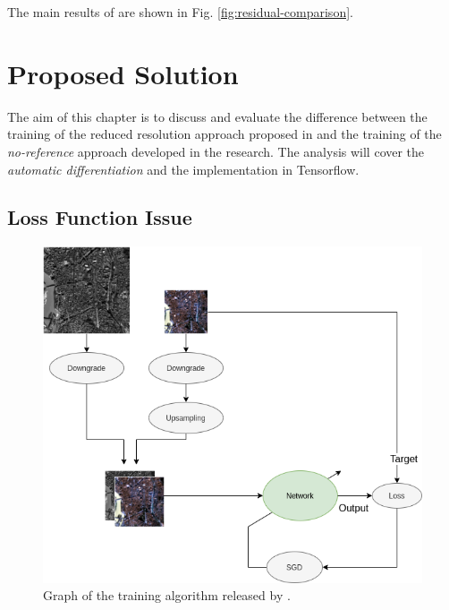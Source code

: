 \documentclass[12pt]{report}
\begin{document}
The main results of \cite{residual4} are shown in Fig. \ref{fig:residual-comparison}.

\newpage

\chapter{Proposed Solution}


The aim of this chapter is to discuss and evaluate the difference between the training of the reduced resolution approach proposed in \cite{pnn}
and the training of the \textit{no-reference} approach developed in the research.
The analysis will cover the \textit{automatic differentiation} and the implementation in Tensorflow.

\section{Loss Function Issue}
\label{sec:lossfunction}
\begin{figure}[t]
    \centering
    \includegraphics[scale=.45]{RRTraining.png}
    \caption{Graph of the training algorithm released by \cite{pnn}.}
    \label{fig:rrtraining}
\end{figure}
\end{document}
